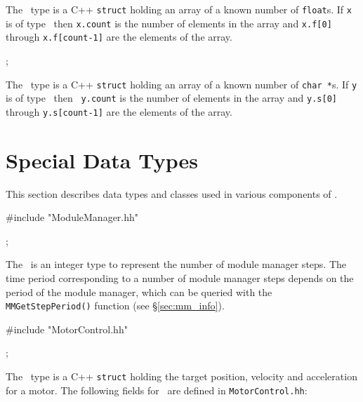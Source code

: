 The \floats\ type is a C++ {\tt struct} holding an array of a known number
of {\tt float}s. If {\tt x} is of type \floats\ then {\tt x.count} is the
number of elements in the array and {\tt x.f[0]} through {\tt x.f[count-1]}
are the elements of the array.

\begin{datatype}
\typedefcmd{\strings}; \\
\end{datatype}

The \strings\ type is a C++ {\tt struct} holding an array of a known
number of {\tt char *}s. If {\tt y} is of type \strings\ then {\tt
y.count} is the number of elements in the array and {\tt y.s[0]}
through {\tt y.s[count-1]} are the elements of the array.

\section{Special Data Types} 
\label{sec:special_types}

This section describes data types and classes used in various components of
\rhexlib.


\begin{codesegment}
#include "ModuleManager.hh"
\end{codesegment}

\begin{datatype}
\typedefcmd{\mmstep}; \\
\end{datatype}

The \mmstep\ is an integer type to represent the number of module manager
steps. The time period corresponding to a number of module manager steps
depends on the period of the module manager, which can be queried with the 
{\tt MMGetStepPeriod()} function (see \S\ref{sec:mm_info}).

\begin{codesegment}
#include "MotorControl.hh"
\end{codesegment}

\begin{datatype}
\typedefcmd{\motortarget}; \\
\end{datatype}

The \motortarget\ type is a C++ {\tt struct} holding the target
position, velocity and acceleration for a motor. The following fields for
\motortarget\ are defined in {\tt MotorControl.hh}:

